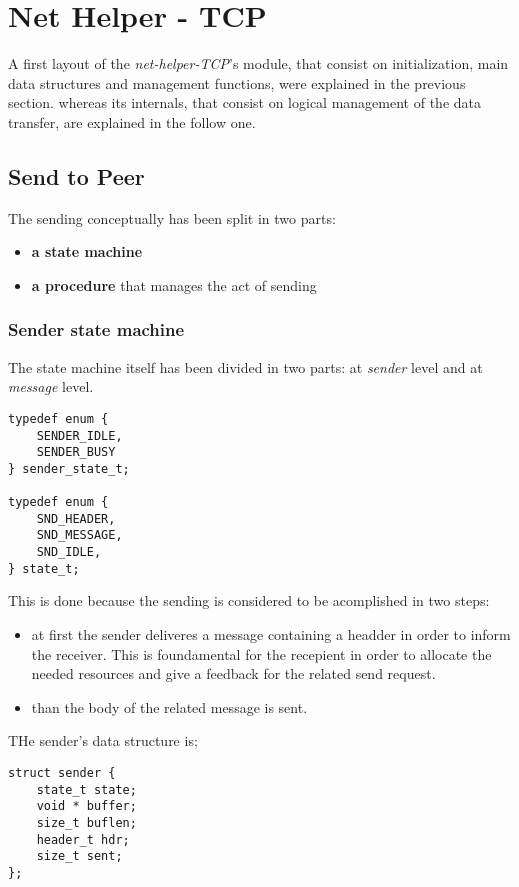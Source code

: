 \section{Net Helper - TCP}
A first layout of the \textit{net-helper-TCP}'s module, that consist on initialization, main data structures
and management functions, were explained in the previous section. whereas its internals, that consist on
logical management of the data transfer, are explained in the follow one.

\subsection{Send to Peer}
The sending conceptually has been split in two parts:
\begin{itemize}
  \item \textbf{a state machine} 
  \item \textbf{a procedure} that manages the act of sending
\end{itemize}


\subsubsection{Sender state machine}
The state machine itself has been divided in two parts: at \textit{sender} level and at \textit{message} level.
\begin{lstlisting}
typedef enum {
    SENDER_IDLE,
    SENDER_BUSY
} sender_state_t;

typedef enum {
    SND_HEADER,
    SND_MESSAGE,
    SND_IDLE,
} state_t;
\end{lstlisting}
This is done because the sending is considered to be acomplished in two steps:
\begin{itemize}
  \item at first the sender deliveres a message containing a headder in order to inform the receiver. This is
        foundamental for the recepient in order to allocate the needed resources and give a feedback for the
        related send request.
  \item than the body of the related message is sent.
\end{itemize}

THe sender's data structure is;
\begin{lstlisting}
struct sender {
    state_t state;
    void * buffer;
    size_t buflen;
    header_t hdr;
    size_t sent;
};
\end{lstlisting}


